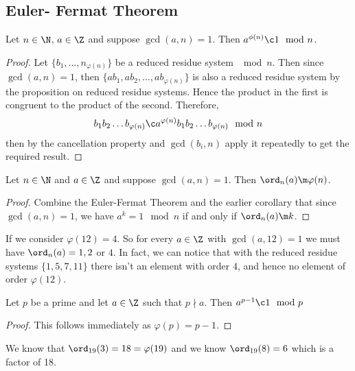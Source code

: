 \subsection{Euler- Fermat Theorem}
\begin{nthm}
  Let $n \in \N$, $a \in \Z$ and suppose $\gcd(a, n) = 1$. Then $a^{\phi(n)} \c 1\mod n$.
\end{nthm}
\begin{proof}
  Let $\{b_1, \dots, n_{\varphi(n)}\}$ be a reduced residue system $\mod n$. Then since $\gcd(a, n) = 1$, then $\{ab_1, ab_2, \dots, ab_{\varphi(n)}\}$ is also a reduced residue system by the proposition on reduced residue systems. Hence the product in the first is congruent to the product of the second. Therefore,
  $$ b_1b_2\dots b_{\varphi(n)} \c a^{\varphi(n)}b_1b_2\dots b_{\varphi(n)}\mod n $$
  then by the cancellation property and $\gcd(b_i, n)$ apply it repeatedly to get the required result.
\end{proof}

\begin{ncor}
   Let $n \in \N$ and $a \in \Z$ and suppose $\gcd(a, n) = 1$. Then $\ord_n(a) \m \varphi(n)$.
\end{ncor}
\begin{proof}
  Combine the Euler-Fermat Theorem and the earlier corollary that since $\gcd(a, n) = 1$, we have $a^k = 1\mod n$ if and only if $\ord_n(a) \m k$.
\end{proof}

\begin{eg}
  If we consider $\varphi(12) = 4$. So for every $a \in \Z$ with $\gcd(a, 12) = 1$ we must have $\ord_n(a) = 1, 2$ or $4$. In fact, we can notice that with the reduced residue systems $\{1, 5, 7, 11\}$ there isn't an element with order $4$, and hence no element of order $\varphi(12)$.
\end{eg}

\begin{ncor}
   Let $p$ be a prime and let $a \in \Z$  such that $p \nmid a$. Then $a^{p-1} \c 1\mod p$
\end{ncor}
\begin{proof}
  This follows immediately as $\varphi(p) = p - 1$.
\end{proof}

\begin{eg}
  We know that $\ord_{19}(3) = 18 = \varphi(19)$ and we know $\ord_{19}(8) = 6$ which is a factor of 18.
\end{eg}

